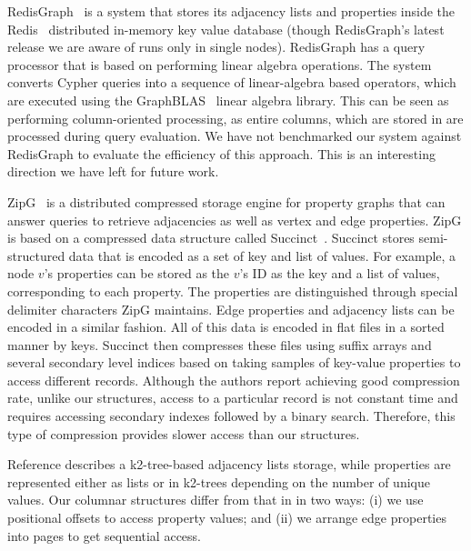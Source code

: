 RedisGraph~\cite{redisgraph} is a system that stores its adjacency lists and properties inside the Redis~\cite{redis} distributed in-memory key value database (though RedisGraph's latest release we are aware of runs only in single nodes).  
RedisGraph has a query processor that is based on performing linear algebra operations. The system converts Cypher queries into a sequence of linear-algebra based operators, which are executed using the GraphBLAS~\cite{} linear algebra library. This can be seen as performing column-oriented processing, as entire columns, which are stored in  are processed during query evaluation. We have not benchmarked our system against RedisGraph to evaluate the efficiency of this approach. This is an interesting direction we have left for future work.

ZipG~\cite{ZipG: A Memory-efficient Graph Store
for Interactive Queries} is a distributed compressed storage engine for property graphs that can answer queries to retrieve adjacencies as well as vertex and edge properties. ZipG is based on a compressed data structure called Succinct~\cite{Succinct: Enabling Queries on Compressed Data}. Succinct stores semi-structured data that is encoded as a set of key and list of values. For example, a node $v$'s properties can be stored as the $v$'s ID as the key and a list of values, corresponding to each property. The properties are distinguished through special delimiter characters ZipG maintains. Edge properties and adjacency lists can be encoded in a similar fashion. All of this data is encoded in flat files in a sorted manner by keys. Succinct then compresses these files using suffix arrays and several secondary level indices based on taking samples of key-value properties to access different records. Although the authors report achieving good compression rate, unlike our structures, access to a particular record is not constant time and requires accessing secondary indexes followed by a binary search. Therefore, this type of compression provides slower access than our structures. 

Reference \cite{compact-rep-graph} describes a k2-tree-based adjacency lists storage, while properties are represented either as lists or in k2-trees depending on the number of unique values. Our columnar structures differ from that in \cite{compact-rep-graph} in two ways: (i) we use positional offsets to access property values; and (ii) we arrange edge properties into pages to get sequential access.

